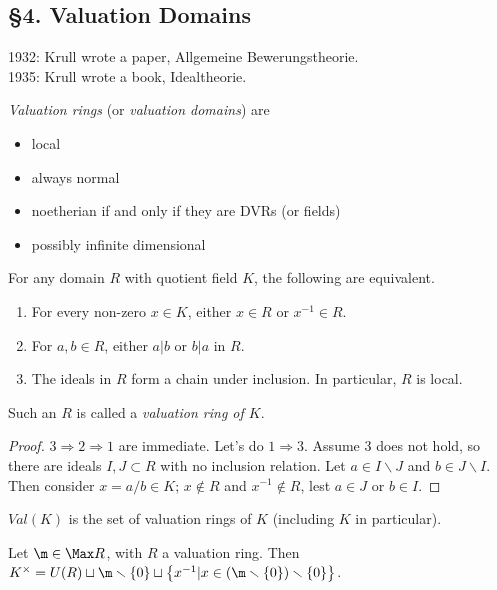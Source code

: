  \subsection{\S 4. Valuation Domains}
 1932: Krull wrote a paper, Allgemeine Bewerungstheorie.\\
 1935: Krull wrote a book, Idealtheorie.

 \emph{Valuation rings} (or \emph{valuation domains}) are
 \begin{itemize}
   \item local
   \item always normal
   \item noetherian if and only if they are DVRs (or fields)
   \item possibly infinite dimensional
 \end{itemize}
 \begin{proposition}
   For any domain $R$ with quotient field $K$, the following are equivalent.
   \begin{enumerate}
     \item For every non-zero $x\in K$, either $x\in R$ or $x^{-1}\in R$.
     \item For $a,b\in R$, either $a|b$ or $b|a$ in $R$.
     \item The ideals in $R$ form a chain under inclusion. In particular, $R$ is local.
   \end{enumerate}
 Such an $R$ is called a \emph{valuation ring of $K$}.
 \end{proposition}
 \begin{proof}
   $3\Rightarrow 2 \Rightarrow 1$ are immediate. Let's do $1\Rightarrow 3$. Assume $3$
   does not hold, so there are ideals $I,J\subset R$ with no inclusion relation. Let $a\in
   I\smallsetminus J$ and $b\in J\smallsetminus I$. Then consider $x=a/b\in K$;
   $x\not\in R$ and $x^{-1}\not\in R$, lest $a\in J$ or $b\in I$.
 \end{proof}
 \begin{definition}
   $Val(K)$ is the set of valuation rings of $K$ (including $K$ in particular).
 \end{definition}
 Let $\m\in \Max R$, with $R$ a valuation ring. Then $K^\times = U(R)\sqcup
 \m\smallsetminus \{0\}\sqcup \bigl\{x^{-1}| x\in (\m\smallsetminus \{0\})\smallsetminus
 \{0\}\bigr\}$.

